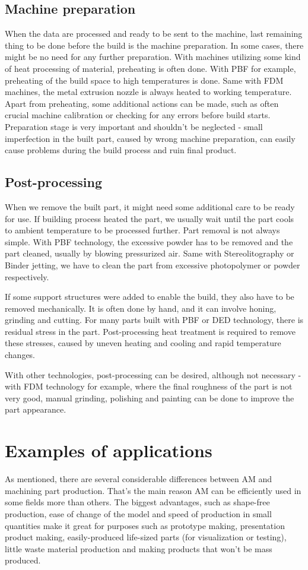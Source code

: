 \documentclass[a4paper, 11pt, reqno]{report}
\begin{document}
\subsection{Machine preparation}
When the data are processed and ready to be sent to the machine, last remaining thing to be done before the build is the machine preparation. In some cases, there might be no need for any further preparation. With machines utilizing some kind of heat processing of material, preheating is often done. With PBF for example, preheating of the build space to high temperatures is done. Same with FDM machines, the metal extrusion nozzle is always heated to working temperature. Apart from preheating, some additional actions can be made, such as often crucial machine calibration or checking for any errors before build starts. Preparation stage is very important and shouldn't be neglected - small imperfection in the built part, caused by wrong machine preparation, can easily cause problems during the build process and ruin final product.
\subsection{Post-processing}
When we remove the built part, it might need some additional care to be ready for use. If building process heated the part, we usually wait until the part cools to ambient temperature to be processed further. Part removal is not always simple. With PBF technology, the excessive powder has to be removed and the part cleaned, usually by blowing pressurized air. Same with Stereolitography or Binder jetting, we have to clean the part from excessive photopolymer or powder respectively.

	If some support structures were added to enable the build, they also have to be removed mechanically. It is often done by hand, and it can involve honing, grinding and cutting. For many parts built with PBF or DED technology, there is residual stress in the part. Post-processing heat treatment is required to remove these stresses, caused by uneven heating and cooling and rapid temperature changes.
	
	With other technologies, post-processing can be desired, although not necessary - with FDM technology for example, where the final roughness of the part is not very good, manual grinding, polishing and painting can be done to improve the part appearance.
\section{Examples of applications}
As mentioned, there are several considerable differences between AM and machining part production. That's the main reason AM can be efficiently used in some fields more than others. The biggest advantages, such as shape-free production, ease of change of the model and speed of production in small quantities make it great for purposes such as prototype making, presentation product making, easily-produced life-sized parts (for visualization or testing), little waste material production and making products that won't be mass produced.\\
\end{document}
